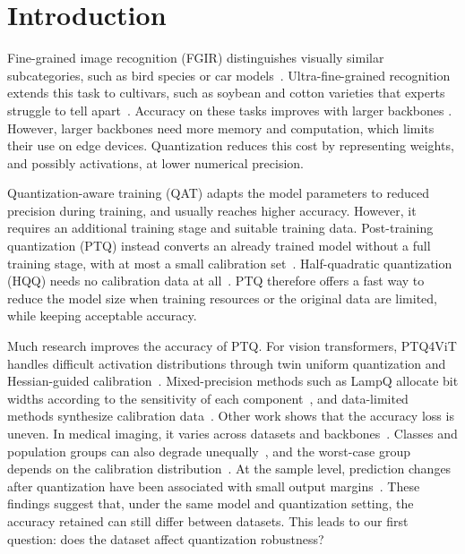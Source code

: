 \section{Introduction}
\label{sec:intro}

Fine-grained image recognition (FGIR) distinguishes visually similar subcategories, such as bird species or car models~\cite{wah2011cub,krause2013cars}.
Ultra-fine-grained recognition extends this task to cultivars, such as soybean and cotton varieties that experts struggle to tell apart~\cite{yu2021benchmark,fang2024learning}.
Accuracy on these tasks improves with larger backbones .
However, larger backbones need more memory and computation, which limits their use on edge devices.
Quantization reduces this cost by representing weights, and possibly activations, at lower numerical precision.

Quantization-aware training (QAT) adapts the model parameters to reduced precision during training, and usually reaches higher accuracy.
However, it requires an additional training stage and suitable training data.
Post-training quantization (PTQ) instead converts an already trained model without a full training stage, with at most a small calibration set~\cite{gholami2021survey}.
Half-quadratic quantization (HQQ) needs no calibration data at all~\cite{badri2023hqq}.
PTQ therefore offers a fast way to reduce the model size when training resources or the original data are limited, while keeping acceptable accuracy.

Much research improves the accuracy of PTQ.
For vision transformers, PTQ4ViT handles difficult activation distributions through twin uniform quantization and Hessian-guided calibration~\cite{yuan2022ptq4vit}.
Mixed-precision methods such as LampQ allocate bit widths according to the sensitivity of each component~\cite{kim2026lampq}, and data-limited methods synthesize calibration data~\cite{zhong2022fdda,kim2025synq}.
Other work shows that the accuracy loss is uneven.
In medical imaging, it varies across datasets and backbones~\cite{ozdemir2026bridging}.
Classes and population groups can also degrade unequally~\cite{liu2025unfairness}, and the worst-case group depends on the calibration distribution~\cite{yuan2023benchmarking}.
At the sample level, prediction changes after quantization have been associated with small output margins~\cite{hu2023towards}.
These findings suggest that, under the same model and quantization setting, the accuracy retained can still differ between datasets.
This leads to our first question: does the dataset affect quantization robustness?

